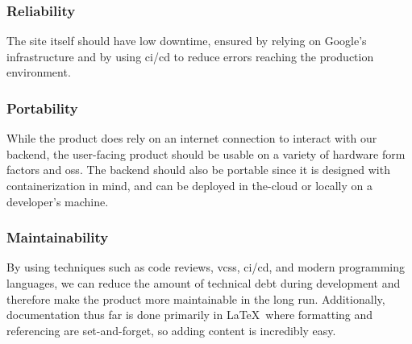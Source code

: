         \subsubsection{Reliability}\label{sec:reliability}
            The site itself should have low downtime, ensured by relying on Google's infrastructure and by using \gls{ci}/\gls{cd} to reduce errors reaching the production environment. 
        \subsubsection{Portability}\label{sec:portability}
            While the product does rely on an internet connection to interact with our backend, the user-facing product should be usable on a variety of hardware form factors and \glspl{os}. The backend should also be portable since it is designed with containerization in mind, and can be deployed in \gls{the-cloud} or locally on a developer's machine.
        \subsubsection{Maintainability}\label{sec:maintainability}
            By using techniques such as code reviews, \glspl{vcs}, \gls{ci}/\gls{cd}, and modern programming languages, we can reduce the amount of technical debt during development and therefore make the product more maintainable in the long run. Additionally, documentation thus far is done primarily in \LaTeX\ where formatting and referencing are set-and-forget, so adding content is incredibly easy.
